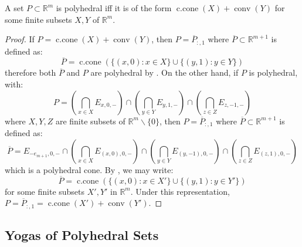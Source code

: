 \begin{prop}\label{prop:017-Minkowski-Weyl-Representation}
	A set $P\subset \mathbb{R}^m$ is polyhedral iff it is of the form $\operatorname{c.cone}(X)+\operatorname{conv}(Y)$ for some finite subsets $X,Y$ of $\mathbb{R}^m$.
\end{prop}
\begin{proof}
	If $P=\operatorname{c.cone}(X)+\operatorname{conv}(Y)$, then $P=\overline{P}_{:,1}$ where $\overline{P}\subset \mathbb{R}^{m+1}$ is defined as:
	\[
		\overline{P}=\operatorname{c.cone}\left(\{(x,0):x\in X\}\cup\{(y,1):y\in Y\}\right)
	\]
	therefore both $\overline{P}$ and $P$ are polyhedral by . On the other hand, if $P$ is polyhedral, with:
	\[
		P=\left(\bigcap_{x\in X} E_{x,0,-}\right)\cap\left(\bigcap_{y\in Y} E_{y,1,-}\right)\cap \left(\bigcap_{z\in Z} E_{z,-1,-}\right)
	\]
	where $X,Y,Z$ are finite subsets of $\mathbb{R}^m\smallsetminus\{0\}$, then $P=\overline{P}_{:,1}$ where $\overline{P}\subset \mathbb{R}^{m+1}$ is defined as:
	\[
		\overline{P}=E_{-e_{m+1},0,-}\cap\left(\bigcap_{x\in X} E_{(x,0),0,-}\right)\cap\left(\bigcap_{y\in Y} E_{(y,-1),0,-}\right)\cap \left(\bigcap_{z\in Z} E_{(z,1),0,-}\right)
	\]
	which is a polyhedral cone. By , we may write:
	\[
		\overline{P}=\operatorname{c.cone}\left(\{(x,0):x\in X'\}\cup \{(y, 1):y\in Y'\}\right)
	\]
	for some finite subsets $X',Y'$ in $\mathbb{R}^m$. Under this representation, $P=\overline{P}_{:,1}=\operatorname{c.cone}(X')+\operatorname{conv}(Y')$.
\end{proof}

\subsection{Yogas of Polyhedral Sets}

